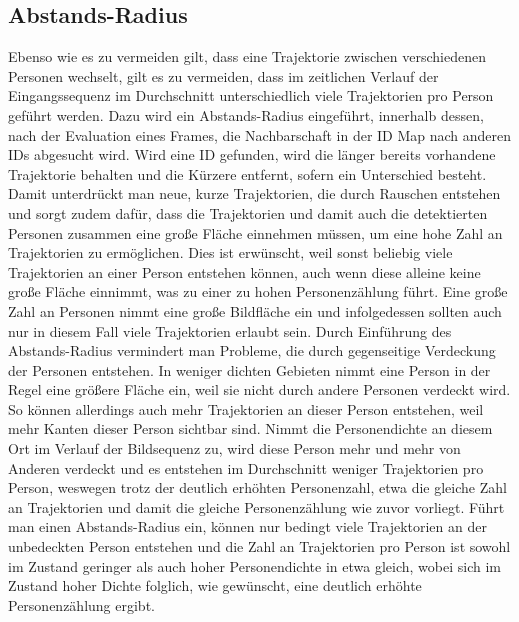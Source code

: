 \subsection{Abstands-Radius}
Ebenso wie es zu vermeiden gilt, dass eine Trajektorie zwischen verschiedenen Personen wechselt, gilt es zu vermeiden, dass im zeitlichen Verlauf der Eingangssequenz im Durchschnitt unterschiedlich viele Trajektorien pro Person geführt werden. Dazu wird ein Abstands-Radius eingeführt, innerhalb dessen, nach der Evaluation eines Frames, die Nachbarschaft in der ID Map nach anderen IDs abgesucht wird. Wird eine ID gefunden, wird die länger bereits vorhandene Trajektorie behalten und die Kürzere entfernt, sofern ein Unterschied besteht. Damit unterdrückt man neue, kurze Trajektorien, die durch Rauschen entstehen und sorgt zudem dafür, dass die Trajektorien und damit auch die detektierten Personen zusammen eine große Fläche einnehmen müssen, um eine hohe Zahl an Trajektorien zu ermöglichen. Dies ist erwünscht, weil sonst beliebig viele Trajektorien an einer Person entstehen können, auch wenn diese alleine keine große Fläche einnimmt, was zu einer zu hohen Personenzählung führt. Eine große Zahl an Personen nimmt eine große Bildfläche ein und infolgedessen sollten auch nur in diesem Fall viele Trajektorien erlaubt sein. Durch Einführung des Abstands-Radius vermindert man Probleme, die durch gegenseitige Verdeckung der Personen entstehen. In weniger dichten Gebieten nimmt eine Person in der Regel eine größere Fläche ein, weil sie nicht durch andere Personen verdeckt wird. So können allerdings auch mehr Trajektorien an dieser Person entstehen, weil mehr Kanten dieser Person sichtbar sind. Nimmt die Personendichte an diesem Ort im Verlauf der Bildsequenz zu, wird diese Person mehr und mehr von Anderen verdeckt und es entstehen im Durchschnitt weniger Trajektorien pro Person, weswegen trotz der deutlich erhöhten Personenzahl, etwa die gleiche Zahl an Trajektorien und damit die gleiche Personenzählung wie zuvor vorliegt. Führt man einen Abstands-Radius ein, können nur bedingt viele Trajektorien an der unbedeckten Person entstehen und die Zahl an Trajektorien pro Person ist sowohl im Zustand geringer als auch hoher Personendichte in etwa gleich, wobei sich im Zustand hoher Dichte folglich, wie gewünscht, eine deutlich erhöhte Personenzählung ergibt.

